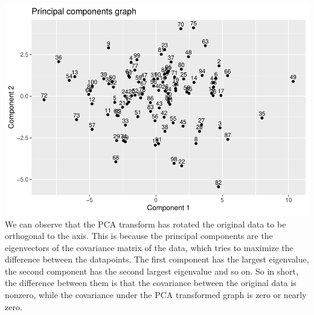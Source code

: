\documentclass[
]{article}
\newenvironment{Shaded}{\begin{snugshade}}{\end{snugshade}}
\newcommand{\AttributeTok}[1]{\textcolor[rgb]{0.77,0.63,0.00}{#1}}
\newcommand{\DecValTok}[1]{\textcolor[rgb]{0.00,0.00,0.81}{#1}}
\newcommand{\FloatTok}[1]{\textcolor[rgb]{0.00,0.00,0.81}{#1}}
\newcommand{\FunctionTok}[1]{\textcolor[rgb]{0.00,0.00,0.00}{#1}}
\newcommand{\NormalTok}[1]{#1}
\newcommand{\SpecialCharTok}[1]{\textcolor[rgb]{0.00,0.00,0.00}{#1}}
\newcommand{\StringTok}[1]{\textcolor[rgb]{0.31,0.60,0.02}{#1}}
\begin{document}
\begin{Shaded}
\end{Shaded}

\includegraphics{assignment2_files/figure-latex/unnamed-chunk-5-2.pdf}
We can observe that the PCA transform has rotated the original data to
be orthogonal to the axis. This is because the principal components are
the eigenvectors of the covariance matrix of the data, which tries to
maximize the difference between the datapoints. The first component has
the largest eigenvalue, the second component has the second largest
eigenvalue and so on. So in short, the difference between them is that
the covariance between the original data is nonzero, while the
covariance under the PCA transformed graph is zero or nearly zero.\\
\end{document}
